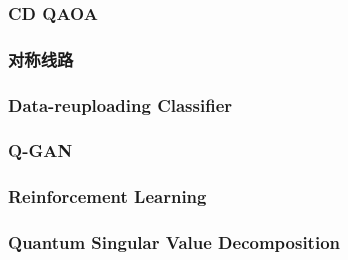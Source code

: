 \subsubsection{CD QAOA}


\subsubsection{对称线路}


\subsubsection{Data-reuploading Classifier}


\subsubsection{Q-GAN}


\subsubsection{Reinforcement Learning}


\subsubsection{Quantum Singular Value Decomposition}

